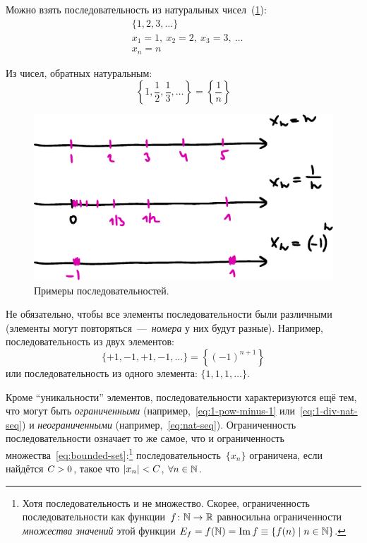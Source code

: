 \documentclass[a4paper,12pt]{article}
\DeclareMathOperator{\Imag}{Im}
\begin{document}
  \begin{example}
    Можно взять последовательность из натуральных чисел~(\ref{fig:sequence-examples}):
    \begin{equation}\label{eq:nat-seq}
      \begin{aligned}
        &\{1, 2, 3, \ldots\}\\
        &x_1 = 1,\ x_2 = 2,\ x_3 = 3,\ \ldots\\
        &x_n = n
      \end{aligned}
    \end{equation}
    
    Из чисел, обратных натуральным:
    \begin{equation}\label{eq:1-div-nat-seq}
      \left\{1, \frac{1}{2}, \frac{1}{3}, \ldots\right\} = \left\{\frac{1}{n}\right\}
    \end{equation}
    
    \begin{figure}[ht]
      \centering
      \includegraphics[width=0.8\linewidth]{images/sequence-examples}
      
      \caption{
        Примеры последовательностей.
      }
      \label{fig:sequence-examples}
    \end{figure}
    
    Не обязательно, чтобы все элементы последовательности были различными (элементы могут повторяться~---~\emph{номера} у них будут разные).
    Например, последовательность из двух элементов:
    \begin{equation}\label{eq:1-pow-minus-1}
      \{+1, -1, +1, -1, \ldots\} = \left\{(-1)^{n + 1}\right\}
    \end{equation}
    или последовательность из одного элемента: $\{1, 1, 1, \ldots\}$.
  \end{example}
    
  Кроме ``уникальности'' элементов, последовательности характеризуются ещё тем, что могут быть \emph{ограниченными} (например,~\eqref{eq:1-pow-minus-1} или~\eqref{eq:1-div-nat-seq}) и \emph{неограниченными} (например,~\eqref{eq:nat-seq}).
  Ограниченность последовательности означает то же самое, что и ограниченность множества~\eqref{eq:bounded-set}:\footnote{
    Хотя последовательность и не множество.
    Скорее, ограниченность последовательности как функции~$f\colon \NN \hm\to \RR$ равносильна ограниченности \emph{множества значений} этой функции $E_f \hm= f(\NN) \hm= \Imag f \hm\equiv \{f(n) \hm\mid n \hm\in \NN\}$.
  }
  последовательность~$\{x_n\}$ ограничена, если найдётся $C \hm> 0$, такое что $|x_n| \hm< C$, $\forall n \hm\in \NN$.
  
\end{document}

